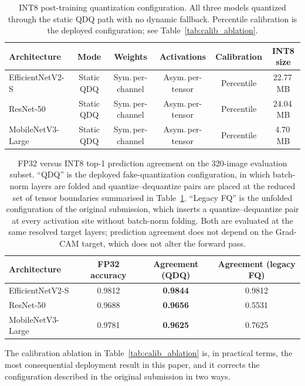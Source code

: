 \documentclass[fleqn,10pt]{wlscirep}
\begin{document}
\begin{table}[!ht]
\centering
\scriptsize
\caption{INT8 post-training quantization configuration. All three models quantized through the static QDQ path with no dynamic fallback. Percentile calibration is the deployed configuration; see Table~\ref{tab:calib_ablation}.}
\label{tab:quant_config}
\setlength{\tabcolsep}{4pt}
\begin{tabular}{lccccc}
\toprule
\textbf{Architecture} & \textbf{Mode} & \textbf{Weights} & \textbf{Activations} & \textbf{Calibration} & \textbf{INT8 size} \\
\midrule
EfficientNetV2-S  & Static QDQ & Sym.\,per-channel & Asym.\,per-tensor & Percentile & 22.77\,MB \\
ResNet-50         & Static QDQ & Sym.\,per-channel & Asym.\,per-tensor & Percentile & 24.04\,MB \\
MobileNetV3-Large & Static QDQ & Sym.\,per-channel & Asym.\,per-tensor & Percentile &  4.70\,MB \\
\bottomrule
\end{tabular}
\end{table}

\begin{table}[!ht]
\centering
\caption{FP32 versus INT8 top-1 prediction agreement on the 320-image evaluation subset. ``QDQ'' is the deployed fake-quantization configuration, in which batch-norm layers are folded and quantize--dequantize pairs are placed at the reduced set of tensor boundaries summarised in Table~\ref{tab:quant_config}. ``Legacy FQ'' is the unfolded configuration of the original submission, which inserts a quantize--dequantize pair at every activation site without batch-norm folding. Both are evaluated at the same resolved target layers; prediction agreement does not depend on the Grad-CAM target, which does not alter the forward pass.}
\label{tab:pred_agreement}
\begin{tabular}{lccc}
\toprule
\textbf{Architecture} & \textbf{FP32 accuracy} & \textbf{Agreement (QDQ)} & \textbf{Agreement (legacy FQ)} \\
\midrule
EfficientNetV2-S  & 0.9812 & \textbf{0.9844} & 0.9812 \\
ResNet-50         & 0.9688 & \textbf{0.9656} & 0.5531 \\
MobileNetV3-Large & 0.9781 & \textbf{0.9625} & 0.7625 \\
\bottomrule
\end{tabular}
\end{table}

The calibration ablation in Table~\ref{tab:calib_ablation} is, in practical terms, the most consequential deployment result in this paper, and it corrects the configuration described in the original submission in two ways.
\end{document}
